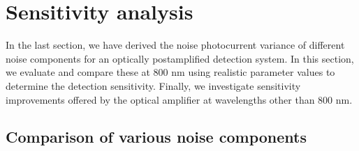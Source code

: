 \section{Sensitivity analysis} \label{sec:JOSAA2013_Section4}

In the last section, we have derived the noise photocurrent variance of different noise components for an optically postamplified detection system. In this section, we evaluate and compare these at 800 nm using realistic parameter values to determine the detection sensitivity. Finally, we investigate sensitivity improvements offered by the optical amplifier at wavelengths other than 800 nm.

\subsection{Comparison of various noise components}


